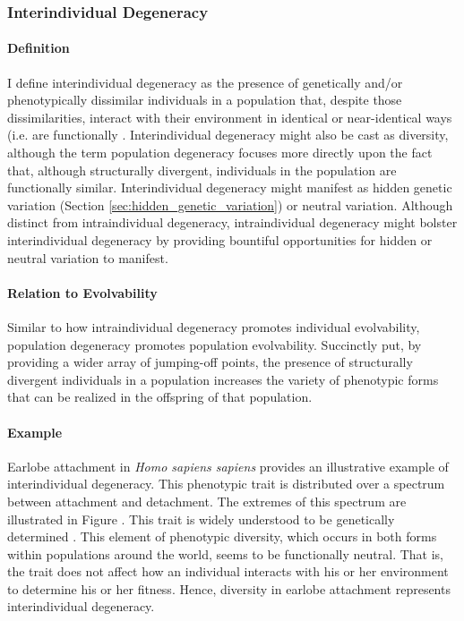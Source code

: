 \subsubsection{Interindividual Degeneracy}

\paragraph{Definition}

I define interindividual degeneracy as the presence of genetically and/or phenotypically dissimilar individuals in a population that, despite those dissimilarities, interact with their environment in identical or near-identical ways (i.e. are functionally . Interindividual degeneracy might also be cast as diversity, although the term population degeneracy focuses more directly upon the fact that, although structurally divergent, individuals in the population are functionally similar. Interindividual degeneracy might manifest as hidden genetic variation (Section \ref{sec:hidden_genetic_variation}) or neutral variation. Although distinct from intraindividual degeneracy, intraindividual degeneracy might bolster interindividual degeneracy by providing bountiful opportunities for hidden or neutral variation to manifest.  \mindmapmark{\interindividualdegeneracyintraindividualdegeneracy}


\paragraph{Relation to Evolvability}
Similar to how intraindividual degeneracy promotes individual evolvability, population degeneracy promotes population evolvability. Succinctly put, by providing a wider array of jumping-off points, the presence of structurally divergent individuals in a population increases the variety of phenotypic forms that can be realized in the offspring of that population.
\mindmapmark{\populationevolvabilityinterindividualdegeneracy}

\paragraph{Example}
Earlobe attachment in \textit{Homo sapiens sapiens} provides an illustrative example of interindividual degeneracy. This phenotypic trait is distributed over a spectrum between attachment and detachment. The extremes of this spectrum are illustrated in Figure . This trait is widely understood to be genetically determined \cite{Dutta1979EarlobeAssam}. This element of phenotypic diversity, which occurs in both forms within populations around the world, seems to be functionally neutral. That is, the trait does not affect how an individual interacts with his or her environment to determine his or her fitness. Hence, diversity in earlobe attachment represents interindividual degeneracy.

